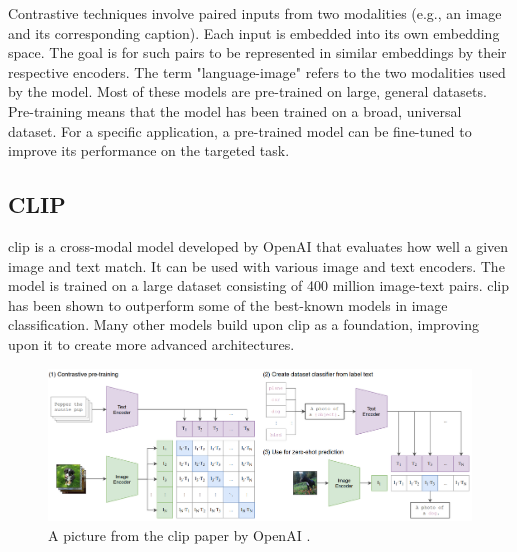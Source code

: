         Contrastive techniques involve paired inputs from two modalities (e.g., an image and its corresponding caption). 
        Each input is embedded into its own embedding space. 
        The goal is for such pairs to be represented in similar embeddings by their respective encoders. 
        The term "language-image" refers to the two modalities used by the model. 
        Most of these models are pre-trained on large, general datasets. 
        Pre-training means that the model has been trained on a broad, universal dataset. 
        For a specific application, a pre-trained model can be fine-tuned to improve its performance on the targeted task.

        \subsection{CLIP
            \label{section:clip}}
        \acrfull{clip} \cite{clip} is a cross-modal model developed by OpenAI \cite{openai} that evaluates how well a given image and text match. 
        It can be used with various image and text encoders. 
        The model is trained on a large dataset consisting of 400 million image-text pairs. 
        \acrshort{clip} has been shown to outperform some of the best-known models in image classification. 
        Many other models build upon \acrshort{clip} as a foundation, improving upon it to create more advanced architectures.
            

        \begin{figure}[]
            \centering
            \includegraphics[width=\textwidth]{Images/crossmodalnetworks/OpenAICLIP.png}
            \caption{A picture from the \acrshort{clip} paper by OpenAI \cite{clip}.}
            \label{fig:crossmodalnetworks:openaiclip}
        \end{figure}

